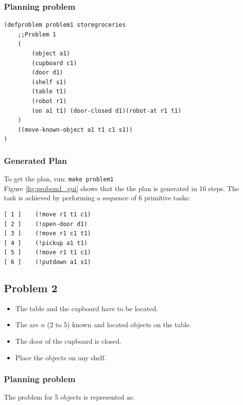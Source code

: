 \documentclass[paper=a4, fontsize=11pt]{scrartcl}
\begin{document}
	\newpage
	
	\subsubsection*{Planning problem}
	
	\begin{lstlisting}
(defproblem problem1 storegroceries
	;;Problem 1
	(
		(object a1)
		(cupboard c1)
		(door d1)
		(shelf s1)
		(table t1)
		(robot r1)
		(on a1 t1) (door-closed d1)(robot-at r1 t1)
	)
	((move-known-object a1 t1 c1 s1))
)
	\end{lstlisting}
	
	\subsubsection*{Generated Plan}
	
	To get the plan, run: \verb|make problem1| \\
	
	Figure \ref{fig:probem1_gui} shows that the the plan is generated in 16 steps. The task is achieved by performing a sequence of 6 primitive tasks: \\
	
	\begin{lstlisting}
[ 1 ]    (!move r1 t1 c1)
[ 2 ]    (!open-door d1)
[ 3 ]    (!move r1 c1 t1)
[ 4 ]    (!pickup a1 t1)
[ 5 ]    (!move r1 t1 c1)
[ 6 ]    (!putdown a1 s1)
	\end{lstlisting}
	
	\subsection{Problem 2}
	
	\begin{itemize}
		\item The table and the cupboard have to be located.
		\item The are $n$ (2 to 5) known and located objects on the table.
		\item The door of the cupboard is closed.
		\item Place the objects on any shelf.
	\end{itemize}
	
	\subsubsection*{Planning problem}
	
	The problem for 5 objects is represented as:
	
\end{document}
